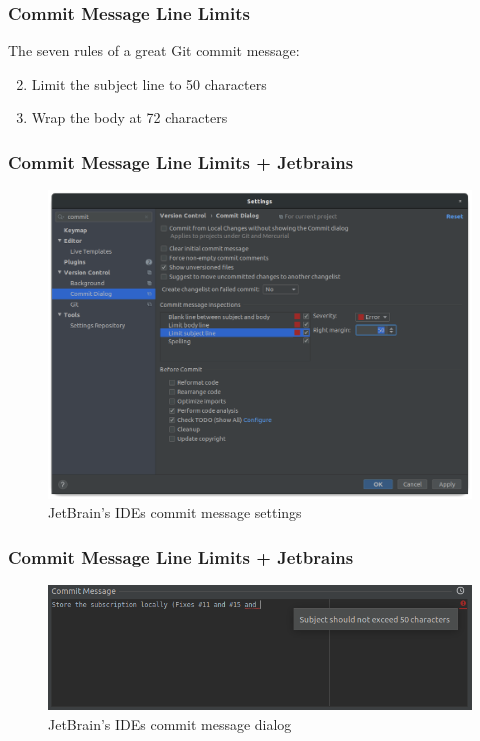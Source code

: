 \documentclass[10pt, compress]{beamer}
\begin{document}
\begin{frame}[fragile]
  \frametitle{Commit Message Line Limits}
  
  The seven rules of a great Git commit message:
  \begin{enumerate}
      \setcounter{enumi}{1}
      \item Limit the subject line to 50 characters
      \setcounter{enumi}{5}
      \item Wrap the body at 72 characters
  \end{enumerate}

\end{frame}

\begin{frame}[fragile]
  \frametitle{Commit Message Line Limits + Jetbrains}
  
  \begin{figure}
      \centering
      \includegraphics[scale=0.25]{images/jetbrains-commit-message-settings.png}
      \caption{JetBrain's IDEs commit message settings}
      \label{fig:commit-settings}
  \end{figure}

\end{frame}

\begin{frame}[fragile]
  \frametitle{Commit Message Line Limits + Jetbrains}
  
  \begin{figure}
      \centering
      \includegraphics[scale=0.35]{images/jetbrains-commit-message.png}
      \caption{JetBrain's IDEs commit message dialog}
      \label{fig:commit-dialog}
  \end{figure}

\end{frame}


\end{document}

